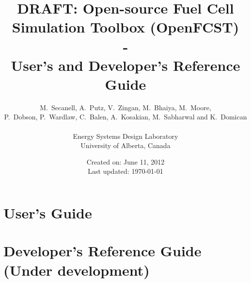 \documentclass[]{book}
\title{{\Huge DRAFT: Open-source Fuel Cell Simulation Toolbox (OpenFCST)} \\
       { - \\}
       {\huge User's and Developer's Reference Guide}}
\author{M.~Secanell, A.~Putz, V.~Zingan, M.~Bhaiya, M.~Moore,\\
        P.~Dobson, P.~Wardlaw, C.~Balen, A.~Kosakian,
        M.~Sabharwal and K.~Domican\\
		\\
        Energy Systems Design Laboratory\\
        University of Alberta, Canada}
\date{Created on: June 11, 2012 \\
      Last updated: \today}
\begin{document}
\maketitle

\tableofcontents



\part{User's Guide}






\part{Developer's Reference Guide (Under development)}



%
%


%
\end{document}
